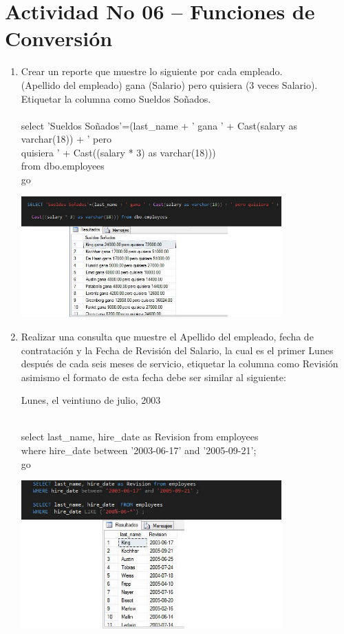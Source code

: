 \section{Actividad No 06 – Funciones de Conversi\'on} 
		
\begin{enumerate}[1.]
	\item Crear un reporte que muestre lo siguiente por cada empleado.
	\\(Apellido del empleado) gana (Salario) pero quisiera (3 veces Salario).
	\\Etiquetar la columna como Sueldos Soñados.
	\\
	\\select 'Sueldos Soñados'=(last\_name + ' gana ' + Cast(salary as varchar(18)) + ' pero 
	\\quisiera ' + Cast((salary * 3) as varchar(18))) 
	\\from dbo.employees
	\\go
	\\
	\begin{center}
	\includegraphics[width=10cm]{./Imagenes/img01} 
	\end{center}

	\item Realizar una consulta que muestre el Apellido del empleado, fecha de contratación y la Fecha de Revisión del Salario, la cual es el primer Lunes después de cada seis meses de servicio, etiquetar la columna como Revisión asimismo el formato de esta fecha debe ser similar al siguiente: 
	\begin{center}
	Lunes, el veintiuno de julio, 2003 
	\end{center}
\
	\\select last\_name, hire\_date as Revision from employees 
	\\where hire\_date between '2003-06-17' and '2005-09-21';
	\\go
	
	\begin{center}
	\includegraphics[width=10cm]{./Imagenes/img02} 
	\end{center}


\end{enumerate}
